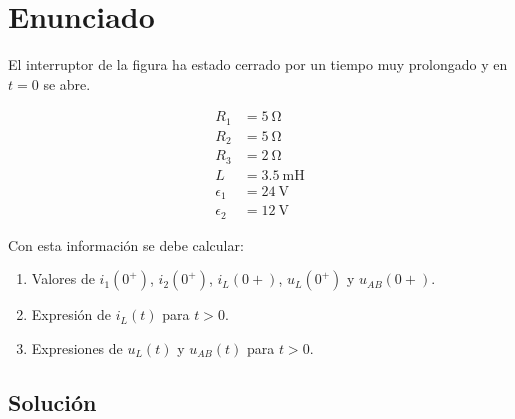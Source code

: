 \section{Enunciado}

El interruptor de la figura ha estado cerrado por un tiempo muy
prolongado y en $t = 0$ se abre.

\begin{minipage}{0.5\linewidth}
\end{minipage}
\begin{minipage}{0.5\linewidth}
  \begin{align*}
    R_1 &= \SI{5}{\ohm}\\
    R_2 &= \SI{5}{\ohm}\\
    R_3 &= \SI{2}{\ohm}\\
    L &= \SI{3.5}{\milli\henry}\\
    \epsilon_1 &= \SI{24}{\volt}\\
    \epsilon_2 &= \SI{12}{\volt}
  \end{align*}
\end{minipage}

\medskip

Con esta información se debe calcular:
\begin{enumerate}
\item Valores de $i_1(0^+)$, $i_2(0^+)$, $i_L(0+)$, $u_L(0^+)$ y
  $u_{AB}(0+)$.
\item Expresión de $i_L(t)$ para $t > 0$.
\item Expresiones de $u_L(t)$ y $u_{AB}(t)$ para $t > 0$.
\end{enumerate}

\subsection*{Solución}

